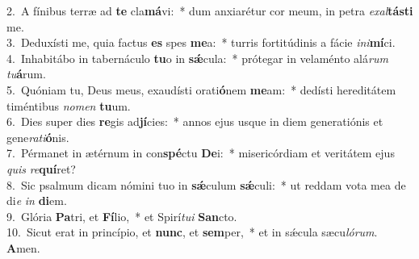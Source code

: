 {2.~}A fínibus terræ ad \textbf{te} cla\textbf{má}vi:~* dum anxiarétur cor meum, in petra \textit{e}\textit{xal}\textbf{tá}\textbf{sti} me.\\
{3.~}Deduxísti me, quia factus \textbf{es} spes \textbf{me}a:~* turris fortitúdinis a fácie \textit{i}\textit{ni}\textbf{mí}ci.\\
{4.~}Inhabitábo in tabernáculo \textbf{tu}o in \textbf{sǽ}cula:~* prótegar in velaménto alá\textit{rum} \textit{tu}\textbf{á}rum.\\
{5.~}Quóniam tu, Deus meus, exaudísti orati\textbf{ó}nem \textbf{me}am:~* dedísti hereditátem timéntibus \textit{no}\textit{men} \textbf{tu}um.\\
{6.~}Dies super dies \textbf{re}gis ad\textbf{jí}cies:~* annos ejus usque in diem generatiónis et gene\textit{ra}\textit{ti}\textbf{ó}nis.\\
{7.~}Pérmanet in ætérnum in con\textbf{spé}ctu \textbf{De}i:~* misericórdiam et veritátem ejus \textit{quis} \textit{re}\textbf{quí}ret?\\
{8.~}Sic psalmum dicam nómini tuo in \textbf{sǽ}culum \textbf{sǽ}culi:~* ut reddam vota mea de di\textit{e} \textit{in} \textbf{di}em.\\
{9.~}Glória \textbf{Pa}tri, et \textbf{Fí}lio,~* et Spirí\textit{tu}\textit{i} \textbf{San}cto.\\
{10.~}Sicut erat in princípio, et \textbf{nunc}, et \textbf{sem}per,~* et in sǽcula sæcu\textit{ló}\textit{rum}. \textbf{A}men.\\
